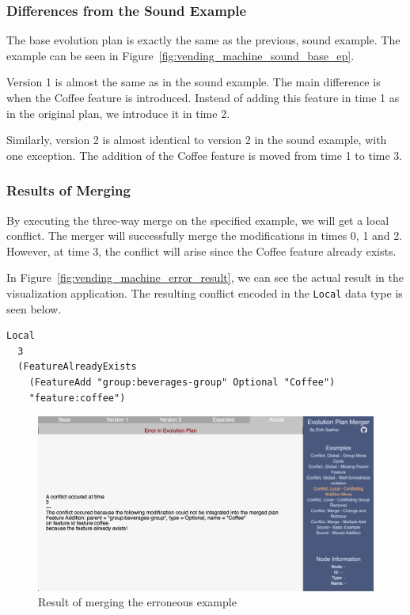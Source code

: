 \documentclass[a4paper,english]{ifimaster}
\begin{document}
\subsubsection{Differences from the Sound Example}%

The base evolution plan is exactly the same as the previous, sound example. The example can be seen in Figure~\vref{fig:vending_machine_sound_base_ep}.

Version 1 is almost the same as in the sound example. The main difference is when the Coffee feature is introduced. Instead of adding this feature in time 1 as in the original plan, we introduce it in time 2.

Similarly, version 2 is almost identical to version 2 in the sound example, with one exception. The addition of the Coffee feature is moved from time 1 to time 3.

\subsubsection{Results of Merging}%
\label{ssub:results_of_merging}

By executing the three-way merge on the specified example, we will get a local conflict. The merger will successfully merge the modifications in times 0, 1 and 2. However, at time 3, the conflict will arise since the Coffee feature already exists.

In Figure~\vref{fig:vending_machine_error_result}, we can see the actual result in the visualization application. The resulting conflict encoded in the \texttt{Local} data type is seen below.

\begin{verbatim}
Local 
  3 
  (FeatureAlreadyExists
    (FeatureAdd "group:beverages-group" Optional "Coffee")
    "feature:coffee")
\end{verbatim}

\begin{figure}[htpb]
  \centering
  \includegraphics[width=\linewidth]{vending_machine/error_result.png}
  \caption{Result of merging the erroneous example}%
  \label{fig:vending_machine_error_result}
\end{figure}
\end{document}
